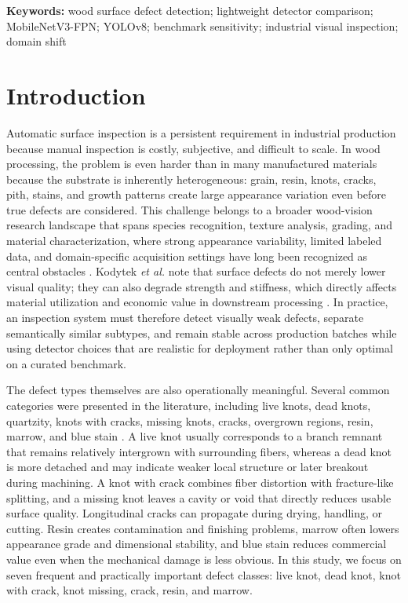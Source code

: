 \documentclass[10pt,a4paper]{article}
\begin{document}
\noindent\textbf{Keywords:} wood surface defect detection; lightweight detector comparison; MobileNetV3-FPN; YOLOv8; benchmark sensitivity; industrial visual inspection; domain shift

\section{Introduction}
\label{sec:introduction}

Automatic surface inspection is a persistent requirement in industrial production because manual inspection is costly, subjective, and difficult to scale. In wood processing, the problem is even harder than in many manufactured materials because the substrate is inherently heterogeneous: grain, resin, knots, cracks, pith, stains, and growth patterns create large appearance variation even before true defects are considered. This challenge belongs to a broader wood-vision research landscape that spans species recognition, texture analysis, grading, and material characterization, where strong appearance variability, limited labeled data, and domain-specific acquisition settings have long been recognized as central obstacles \citep{hwang_sugiyama_review,da_silva_2017,souza_2020,de_geus_2021,kirbas_2022,he_2021_woodresearch,herrera_poyatos_2024}. Kodytek \textit{et al.} note that surface defects do not merely lower visual quality; they can also degrade strength and stiffness, which directly affects material utilization and economic value in downstream processing \citep{kodytek_dataset}. In practice, an inspection system must therefore detect visually weak defects, separate semantically similar subtypes, and remain stable across production batches while using detector choices that are realistic for deployment rather than only optimal on a curated benchmark.

The defect types themselves are also operationally meaningful. Several common categories were presented in the literature, including live knots, dead knots, quartzity, knots with cracks, missing knots, cracks, overgrown regions, resin, marrow, and blue stain \citep{kodytek_dataset}. A live knot usually corresponds to a branch remnant that remains relatively intergrown with surrounding fibers, whereas a dead knot is more detached and may indicate weaker local structure or later breakout during machining. A knot with crack combines fiber distortion with fracture-like splitting, and a missing knot leaves a cavity or void that directly reduces usable surface quality. Longitudinal cracks can propagate during drying, handling, or cutting. Resin creates contamination and finishing problems, marrow often lowers appearance grade and dimensional stability, and blue stain reduces commercial value even when the mechanical damage is less obvious. In this study, we focus on seven frequent and practically important defect classes: live knot, dead knot, knot with crack, knot missing, crack, resin, and marrow. 
\end{document}
